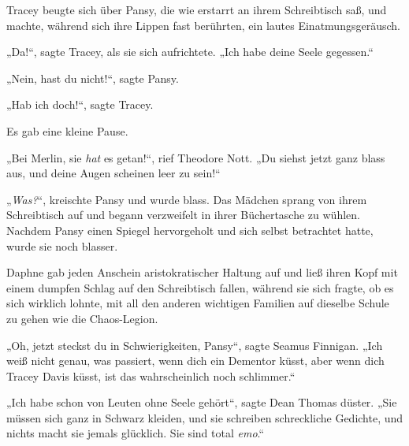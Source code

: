Tracey beugte sich über Pansy, die wie erstarrt an ihrem Schreibtisch saß, und machte, während sich ihre Lippen fast berührten, ein lautes Einatmungsgeräusch.

„Da!“, sagte Tracey, als sie sich aufrichtete. „Ich habe deine Seele gegessen.“

„Nein, hast du nicht!“, sagte Pansy.

„Hab ich doch!“, sagte Tracey.

Es gab eine kleine Pause.

„Bei Merlin, sie \emph{hat} es getan!“, rief Theodore Nott. „Du siehst jetzt ganz blass aus, und deine Augen scheinen leer zu sein!“

„\emph{Was?}“, kreischte Pansy und wurde blass. Das Mädchen sprang von ihrem Schreibtisch auf und begann verzweifelt in ihrer Büchertasche zu wühlen. Nachdem Pansy einen Spiegel hervorgeholt und sich selbst betrachtet hatte, wurde sie noch blasser.

Daphne gab jeden Anschein aristokratischer Haltung auf und ließ ihren Kopf mit einem dumpfen Schlag auf den Schreibtisch fallen, während sie sich fragte, ob es sich wirklich lohnte, mit all den anderen wichtigen Familien auf dieselbe Schule zu gehen wie die Chaos-Legion.

„Oh, jetzt steckst du in Schwierigkeiten, Pansy“, sagte Seamus Finnigan. „Ich weiß nicht genau, was passiert, wenn dich ein Dementor küsst, aber wenn dich Tracey Davis küsst, ist das wahrscheinlich noch schlimmer.“

„Ich habe schon von Leuten ohne Seele gehört“, sagte Dean Thomas düster. „Sie müssen sich ganz in Schwarz kleiden, und sie schreiben schreckliche Gedichte, und nichts macht sie jemals glücklich. Sie sind total \emph{emo}.“

